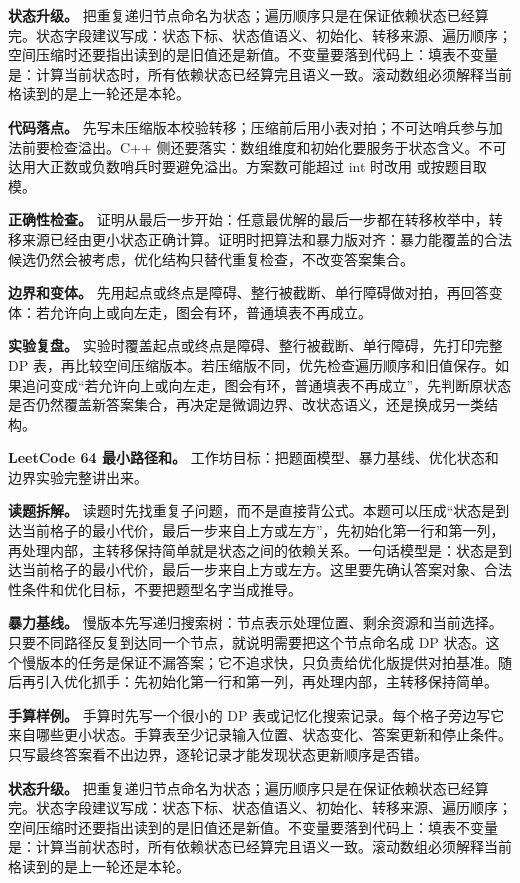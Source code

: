 \textbf{状态升级。} 把重复递归节点命名为状态；遍历顺序只是在保证依赖状态已经算完。状态字段建议写成：状态下标、状态值语义、初始化、转移来源、遍历顺序；空间压缩时还要指出读到的是旧值还是新值。不变量要落到代码上：填表不变量是：计算当前状态时，所有依赖状态已经算完且语义一致。滚动数组必须解释当前格读到的是上一轮还是本轮。

\textbf{代码落点。} 先写未压缩版本校验转移；压缩前后用小表对拍；不可达哨兵参与加法前要检查溢出。C++ 侧还要落实：数组维度和初始化要服务于状态含义。不可达用大正数或负数哨兵时要避免溢出。方案数可能超过 int 时改用  或按题目取模。

\textbf{正确性检查。} 证明从最后一步开始：任意最优解的最后一步都在转移枚举中，转移来源已经由更小状态正确计算。证明时把算法和暴力版对齐：暴力能覆盖的合法候选仍然会被考虑，优化结构只替代重复检查，不改变答案集合。

\textbf{边界和变体。} 先用起点或终点是障碍、整行被截断、单行障碍做对拍，再回答变体：若允许向上或向左走，图会有环，普通填表不再成立。

\textbf{实验复盘。} 实验时覆盖起点或终点是障碍、整行被截断、单行障碍，先打印完整 DP 表，再比较空间压缩版本。若压缩版不同，优先检查遍历顺序和旧值保存。如果追问变成“若允许向上或向左走，图会有环，普通填表不再成立”，先判断原状态是否仍然覆盖新答案集合，再决定是微调边界、改状态语义，还是换成另一类结构。

\noindent\textbf{LeetCode 64 最小路径和。} 工作坊目标：把题面模型、暴力基线、优化状态和边界实验完整讲出来。

\textbf{读题拆解。} 读题时先找重复子问题，而不是直接背公式。本题可以压成“状态是到达当前格子的最小代价，最后一步来自上方或左方”，先初始化第一行和第一列，再处理内部，主转移保持简单就是状态之间的依赖关系。一句话模型是：状态是到达当前格子的最小代价，最后一步来自上方或左方。这里要先确认答案对象、合法性条件和优化目标，不要把题型名字当成推导。

\textbf{暴力基线。} 慢版本先写递归搜索树：节点表示处理位置、剩余资源和当前选择。只要不同路径反复到达同一个节点，就说明需要把这个节点命名成 DP 状态。这个慢版本的任务是保证不漏答案；它不追求快，只负责给优化版提供对拍基准。随后再引入优化抓手：先初始化第一行和第一列，再处理内部，主转移保持简单。

\textbf{手算样例。} 手算时先写一个很小的 DP 表或记忆化搜索记录。每个格子旁边写它来自哪些更小状态。手算表至少记录输入位置、状态变化、答案更新和停止条件。只写最终答案看不出边界，逐轮记录才能发现状态更新顺序是否错。

\textbf{状态升级。} 把重复递归节点命名为状态；遍历顺序只是在保证依赖状态已经算完。状态字段建议写成：状态下标、状态值语义、初始化、转移来源、遍历顺序；空间压缩时还要指出读到的是旧值还是新值。不变量要落到代码上：填表不变量是：计算当前状态时，所有依赖状态已经算完且语义一致。滚动数组必须解释当前格读到的是上一轮还是本轮。

